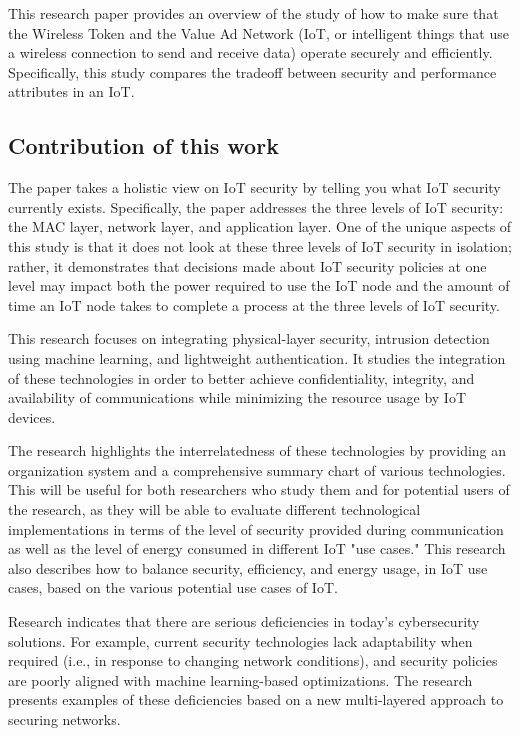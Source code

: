 \documentclass[a4paper,fleqn]{cas-dc}
\numberwithin{equation}{section}
\begin{document}
This research paper provides an overview of the study of how to make sure that the Wireless Token and the Value Ad Network (IoT, or intelligent things that use a wireless connection to send and receive data) operate securely and efficiently. Specifically, this study compares the tradeoff between security and performance attributes in an IoT.

\subsection{Contribution of this work}

The paper takes a holistic view on IoT security by telling you what IoT security currently exists. Specifically, the paper addresses the three levels of IoT security: the MAC layer, network layer, and application layer. One of the unique aspects of this study is that it does not look at these three levels of IoT security in isolation; rather, it demonstrates that decisions made about IoT security policies at one level may impact both the power required to use the IoT node and the amount of time an IoT node takes to complete a process at the three levels of IoT security.

This research focuses on integrating physical-layer security, intrusion detection using machine learning, and lightweight authentication. It studies the integration of these technologies in order to better achieve confidentiality, integrity, and availability of communications while minimizing the resource usage by IoT devices.

The research highlights the interrelatedness of these technologies by providing an organization system and a comprehensive summary chart of various technologies. This will be useful for both researchers who study them and for potential users of the research, as they will be able to evaluate different technological implementations in terms of the level of security provided during communication as well as the level of energy consumed in different IoT "use cases." This research also describes how to balance security, efficiency, and energy usage, in IoT use cases, based on the various potential use cases of IoT.

Research indicates that there are serious deficiencies in today's cybersecurity solutions. For example, current security technologies lack adaptability when required (i.e., in response to changing network conditions), and security policies are poorly aligned with machine learning-based optimizations. The research presents examples of these deficiencies based on a new multi-layered approach to securing networks.
\end{document}
